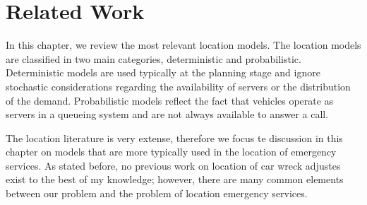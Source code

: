 \chapter{Related Work}
\label{ch:RelatedWork}
In this chapter,
we review
the most relevant
location models.
The location models
are classified in two main categories,
deterministic and probabilistic.
Deterministic models
are used typically at the planning stage
and ignore stochastic considerations
regarding the availability of servers
or the distribution of the demand.
Probabilistic models
reflect the fact that
vehicles operate as servers in a queueing system
and are not always available
to answer a call.

The location literature is very extense,
therefore
we focus te discussion in this chapter
on models
that are more typically used
in the location of emergency services.
As stated before,
no previous work
on location of car wreck adjustes exist
to the best of my knowledge;
however,
there are many common elements
between our problem
and the problem of location emergency services.





